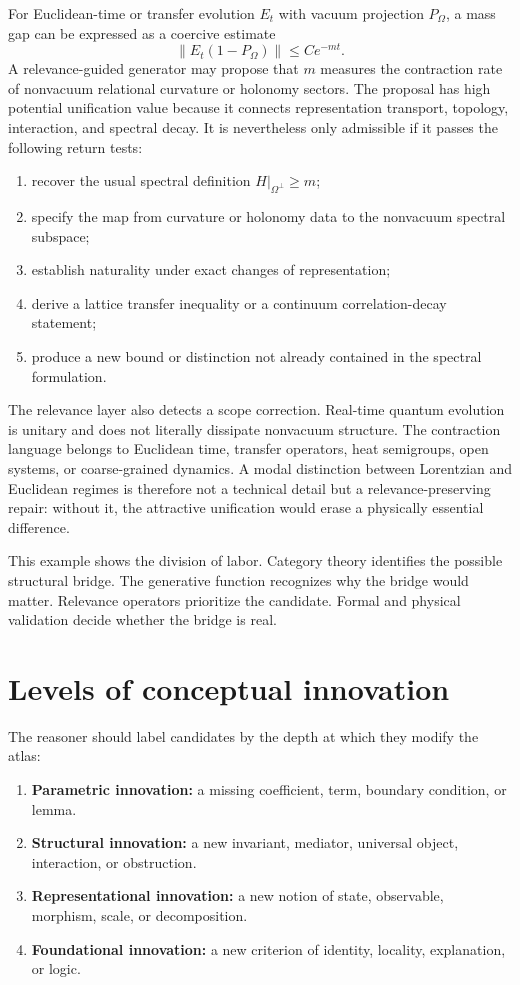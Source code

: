 \documentclass[11pt]{article}
\begin{document}
For Euclidean-time or transfer evolution $E_t$ with vacuum projection $P_\Omega$, a mass gap can be
expressed as a coercive estimate
\begin{equation}
\lVert E_t(1-P_\Omega)\rVert\leq C e^{-mt}.
\label{eq:gap}
\end{equation}
A relevance-guided generator may propose that $m$ measures the contraction rate of nonvacuum
relational curvature or holonomy sectors. The proposal has high potential unification value because it
connects representation transport, topology, interaction, and spectral decay. It is nevertheless only
admissible if it passes the following return tests:
\begin{enumerate}
  \item recover the usual spectral definition $H|_{\Omega^\perp}\geq m$;
  \item specify the map from curvature or holonomy data to the nonvacuum spectral subspace;
  \item establish naturality under exact changes of representation;
  \item derive a lattice transfer inequality or a continuum correlation-decay statement;
  \item produce a new bound or distinction not already contained in the spectral formulation.
\end{enumerate}

The relevance layer also detects a scope correction. Real-time quantum evolution is unitary and does
not literally dissipate nonvacuum structure. The contraction language belongs to Euclidean time,
transfer operators, heat semigroups, open systems, or coarse-grained dynamics. A modal distinction
between Lorentzian and Euclidean regimes is therefore not a technical detail but a relevance-preserving
repair: without it, the attractive unification would erase a physically essential difference.

This example shows the division of labor. Category theory identifies the possible structural bridge.
The generative function recognizes why the bridge would matter. Relevance operators prioritize the
candidate. Formal and physical validation decide whether the bridge is real.

\section{Levels of conceptual innovation}

The reasoner should label candidates by the depth at which they modify the atlas:
\begin{enumerate}
  \item \textbf{Parametric innovation:} a missing coefficient, term, boundary condition, or lemma.
  \item \textbf{Structural innovation:} a new invariant, mediator, universal object, interaction, or
  obstruction.
  \item \textbf{Representational innovation:} a new notion of state, observable, morphism, scale, or
  decomposition.
  \item \textbf{Foundational innovation:} a new criterion of identity, locality, explanation, or logic.
\end{enumerate}
\end{document}
